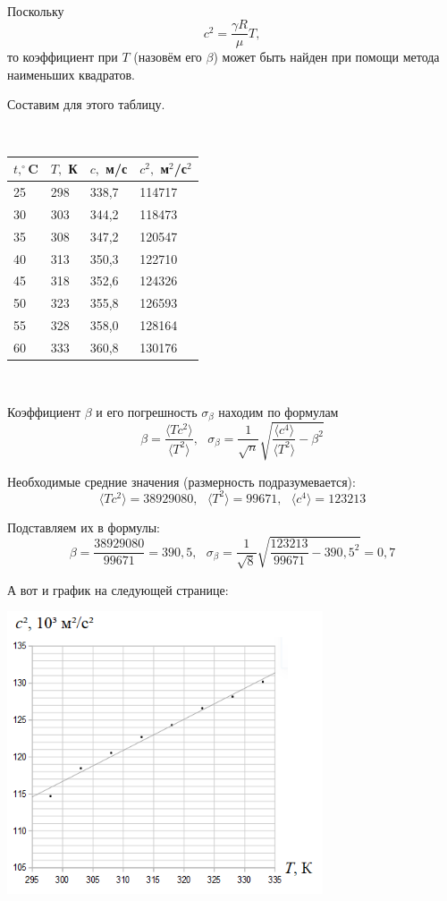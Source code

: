 \documentclass[12pt]{article}
\begin{document}
~

Поскольку
$$c^2 = \frac{\gamma R}{\mu} T,$$
\noindent то коэффициент при $T$ (назовём его $\beta$) может быть найден при помощи метода наименьших квадратов.

Составим для этого таблицу.

~

\noindent\begin{tabular}{|l|l|l|l|}
\hline
$t, ^\circ$C & $T,$ К & $c,$ м/с & $c^2,$ м$^2$/с$^2$ \\
\hline
25 & 298 & 338,7 & 114717 \\
30 & 303 & 344,2 & 118473 \\
35 & 308 & 347,2 & 120547 \\
40 & 313 & 350,3 & 122710 \\
45 & 318 & 352,6 & 124326 \\
50 & 323 & 355,8 & 126593 \\
55 & 328 & 358,0 & 128164 \\
60 & 333 & 360,8 & 130176 \\
\hline
\end{tabular}

~

Коэффициент $\beta$ и его погрешность $\sigma_\beta$ находим по формулам
$$\beta = \frac{\langle Tc^2 \rangle}{\langle T^2 \rangle},~~~\sigma_\beta = \frac{1}{\sqrt{n}} \sqrt{\frac{\langle c^4 \rangle}{\langle T^2 \rangle} - \beta^2}$$

Необходимые средние значения (размерность подразумевается):
$$\langle Tc^2 \rangle = 38929080,~~~
\langle T^2 \rangle = 99671,~~~
\langle c^4 \rangle = 123213$$

Подставляем их в формулы:
$$\beta = \frac{38929080}{99671} = 390,5,~~~\sigma_\beta = \frac{1}{\sqrt{8}} \sqrt{\frac{123213}{99671} - 390,5^2} = 0,7$$

А вот и график на следующей странице:

\begin{center}\includegraphics[width=0.7\textwidth]{2133.png}\end{center}
\end{document}
